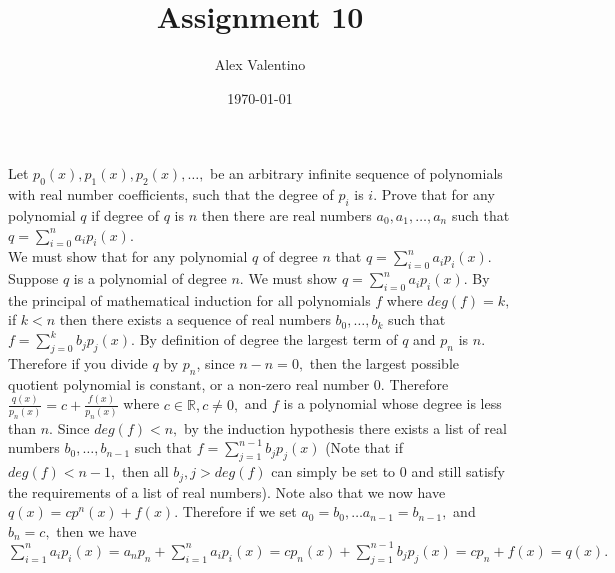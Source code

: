 \documentclass[12pt, letterpaper]{article}
\date{\today}
\author{Alex Valentino}
\title{Assignment 10}
\newcommand{\R}{\mathbb{R}}
\begin{document}
	Let $p_0(x),p_1(x),p_2(x),\ldots,$ be an arbitrary infinite sequence of polynomials with real number coefficients, such that the degree of $p_i$ is $i$.  Prove that for any polynomial $q$ if degree of $q$ is $n$ then there are real numbers $a_0,a_1,\ldots,a_n$ such that
$q=\sum_{i=0}^n a_i p_i(x)$.\\

We must show that for any polynomial $q$ of degree $n$ that $q=\sum_{i=0}^n a_i p_i(x)$. Suppose $q$ is a polynomial of degree $n$.  We must show $q=\sum_{i=0}^n a_i p_i(x)$. By the principal of mathematical induction for all polynomials $f$ where $deg(f) = k,$ if $k < n$ then there exists a sequence of real numbers $b_0,\ldots,b_k$ such that $f = \sum_{j=0}^k b_j p_j (x).$  By definition of degree the largest term of $q$ and $p_n$ is $n$.  Therefore if you divide $q$ by $p_n$, since $n-n = 0,$ then the largest possible quotient polynomial is constant, or a non-zero real number 0.  Therefore $\frac{q(x)}{p_n(x)} = c + \frac{f(x)}{p_n(x)}$ where $c\in \R, c \neq 0,$ and $f$ is a polynomial whose degree is less than $n$.  Since $deg(f) < n,$ by the induction hypothesis there exists a list of real numbers $b_0, \ldots, b_{n-1}$ such that $f = \sum_{j=1}^{n-1} b_j p_j (x)$ (Note that if $deg(f) < n-1,$ then all $b_j, j > deg(f)$ can simply be set to 0 and still satisfy the requirements of a list of real numbers). Note also that we now have $q(x) = c p^n(x) + f(x)$. Therefore if we set $a_0 = b_0,\ldots a_{n-1} = b_{n-1},$ and $b_n = c,$ then we have $\sum_{i=1}^n a_i p_i (x) = a_n p_n + \sum_{i=1}^n a_i p_i (x) = c p_n (x) + \sum_{j=1}^{n-1} b_j p_j(x)= c p_n + f(x) = q(x).$

\iffalse
 By definition of degree the largest term of $q$ must be $cx^n,$ where $c\in \R, c \neq 0.$ Let the polynomial f be given by $f= q - cx^n.$  Since the largest possible degree of $f$ is $n-1$, and $n-1 < n,$ then by the induction hypothesis there exists $b_0,\ldots b_{n-1}$ such that $f = \sum_{j=1}^{n-1} b_j p_j (x).$  Note that if $deg(f) < n-1,$ we can simply set all terms $b_i, i > deg(f)$ to 0.  
\fi
\end{document}
